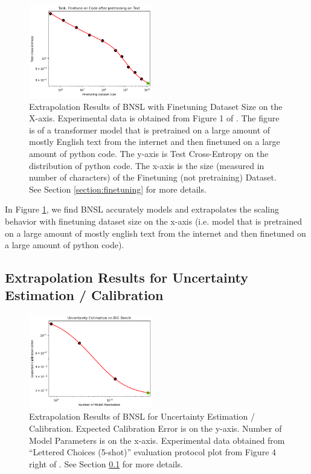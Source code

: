 \documentclass{article} %
\begin{document}
\begin{figure}[htbp]
    \centering
\includegraphics[width=0.48\textwidth]{figures/finetuning/language_code_finetuning.png}
    \caption{
Extrapolation Results of BNSL with Finetuning Dataset Size on the X-axis. Experimental data is obtained from Figure 1 of \cite{2021arXiv210201293H}. The figure is of a transformer model that is pretrained on a large amount of mostly English text from the internet and then finetuned on a large amount of python code. The y-axis is Test Cross-Entropy on the distribution of python code. The x-axis is the size (measured in number of characters) of the Finetuning (not pretraining) Dataset. See Section \ref{section:finetuning} for more details.
    }
    \label{fig:finetuning}
\end{figure}

In Figure \ref{fig:finetuning}, we find BNSL accurately models and extrapolates the scaling behavior with finetuning dataset size on the x-axis (i.e. model that is pretrained on a large amount of mostly english text from the internet and then finetuned on a large amount of python code).

\subsection{Extrapolation Results for Uncertainty Estimation / Calibration}
\label{section:uncertainty}

\begin{figure}[htbp]
    \centering
\includegraphics[width=0.48\textwidth]{figures/uncertainty/uncertainty.png}
    \caption{
Extrapolation Results of BNSL for Uncertainty Estimation / Calibration. Expected Calibration Error is on the y-axis. Number of Model Parameters is on the x-axis. Experimental data obtained from ``Lettered Choices (5-shot)'' evaluation protocol plot from Figure 4 right of \cite{kadavath2022language}. See Section \ref{section:uncertainty} for more details.
    }
    \label{fig:uncertainty}
\end{figure}
\end{document}
